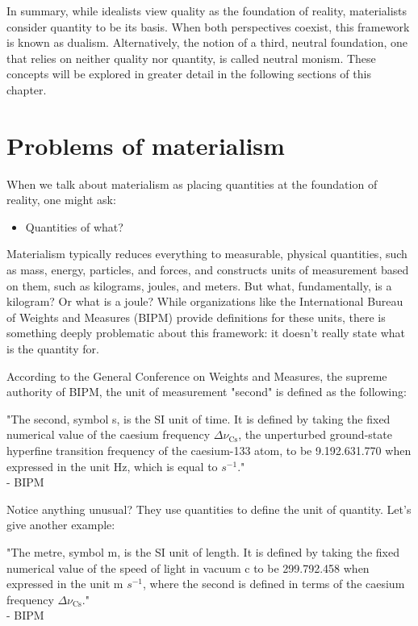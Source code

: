 In summary, while idealists view quality as the foundation of reality, materialists
consider quantity to be its basis. When both perspectives coexist, this framework is
known as dualism. Alternatively, the notion of a third, neutral foundation, one that
relies on neither quality nor quantity, is called neutral monism. These concepts will
be explored in greater detail in the following sections of this chapter.

\section{Problems of materialism}
When we talk about materialism as placing quantities at the foundation of reality,
one might ask:

\begin{itemize}
    \item Quantities of what?
\end{itemize}

Materialism typically reduces everything to measurable, physical quantities, such as mass,
energy, particles, and forces, and constructs units of measurement based on them, such as
kilograms, joules, and meters. But what, fundamentally, is a kilogram? Or what is
a joule? While organizations like the International Bureau of Weights and
Measures (BIPM) provide definitions for these units, there is something deeply
problematic about this framework: it doesn't really state what is the quantity for.

According to the General Conference on Weights and Measures, the supreme authority of
BIPM, the unit of measurement "second" is defined as the following:

\begin{center}
    \itshape
    \parbox{0.7\textwidth}{
    "The second, symbol s, is the SI unit of time. It is defined by taking the fixed
    numerical value of the caesium frequency $\Delta\nu_{\text{Cs}}$, the unperturbed
    ground-state hyperfine transition frequency of the caesium-133 atom, to be 9.192.631.770
    when expressed in the unit Hz, which is equal to $s^{-1}$."\\
    \normalfont - BIPM \cite{BIPMSecond}
    }
\end{center}

Notice anything unusual? They use quantities to define the unit of quantity. Let's give
another example:

\begin{center}
    \itshape
    \parbox{0.7\textwidth}{
    "The metre, symbol m, is the SI unit of length. It is defined by taking the fixed
    numerical value of the speed of light in vacuum c to be 299.792.458 when expressed in
    the unit m $s^{-1}$, where the second is defined in terms of the caesium frequency
    $\Delta\nu_{\text{Cs}}$."\\
    \normalfont - BIPM \cite{BIPMMetre}
    }
\end{center}

